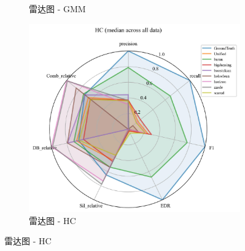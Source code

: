 \documentclass[10pt]{article} %
\numberwithin{equation}{section}
\begin{document}
\begin{enumerate}[label=(\alph*)]
\begin{figure}[htbp]
\begin{subfigure}[b]{0.30\linewidth}
        \caption{雷达图 - GMM}
        \label{fig:radar_gmm}
    \end{subfigure}
    \hfill
    \begin{subfigure}[b]{0.30\linewidth}
        \centering
        \includegraphics[width=\linewidth]{figures/radar graph/radar_HC.pdf}
        \caption{雷达图 - HC}
        \label{fig:radar_hc}
    \end{subfigure}

    \vspace{1em} %


\end{figure}
\end{enumerate}
\end{document}
